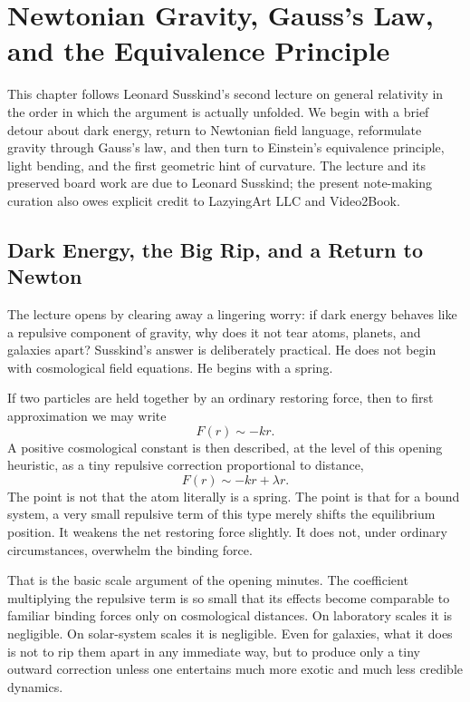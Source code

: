 \chapter{Newtonian Gravity, Gauss's Law, and the Equivalence Principle}

This chapter follows Leonard Susskind's second lecture on general relativity in the order in which the argument is actually unfolded. We begin with a brief detour about dark energy, return to Newtonian field language, reformulate gravity through Gauss's law, and then turn to Einstein's equivalence principle, light bending, and the first geometric hint of curvature. The lecture and its preserved board work are due to Leonard Susskind; the present note-making curation also owes explicit credit to LazyingArt LLC and Video2Book.

\section{Dark Energy, the Big Rip, and a Return to Newton}

The lecture opens by clearing away a lingering worry: if dark energy behaves like a repulsive component of gravity, why does it not tear atoms, planets, and galaxies apart? Susskind's answer is deliberately practical. He does not begin with cosmological field equations. He begins with a spring.

If two particles are held together by an ordinary restoring force, then to first approximation we may write
\begin{equation}
F(r)\sim -kr.
\end{equation}
A positive cosmological constant is then described, at the level of this opening heuristic, as a tiny repulsive correction proportional to distance,
\begin{equation}
F(r)\sim -kr+\lambda r.
\end{equation}
The point is not that the atom literally is a spring. The point is that for a bound system, a very small repulsive term of this type merely shifts the equilibrium position. It weakens the net restoring force slightly. It does not, under ordinary circumstances, overwhelm the binding force.

That is the basic scale argument of the opening minutes. The coefficient multiplying the repulsive term is so small that its effects become comparable to familiar binding forces only on cosmological distances. On laboratory scales it is negligible. On solar-system scales it is negligible. Even for galaxies, what it does is not to rip them apart in any immediate way, but to produce only a tiny outward correction unless one entertains much more exotic and much less credible dynamics.


